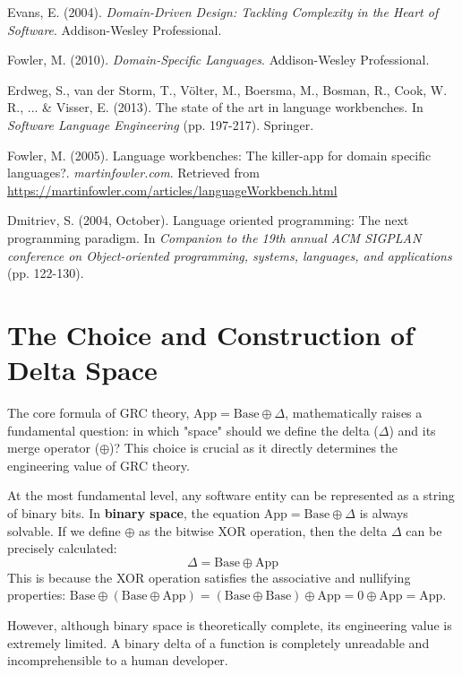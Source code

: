 \documentclass[11pt]{article}
\begin{document}
\begin{thebibliography}{99}
Evans, E. (2004). \textit{Domain-Driven Design: Tackling Complexity in the Heart of Software}. Addison-Wesley Professional.

Fowler, M. (2010). \textit{Domain-Specific Languages}. Addison-Wesley Professional.

Erdweg, S., van der Storm, T., Völter, M., Boersma, M., Bosman, R., Cook, W. R., ... \& Visser, E. (2013). The state of the art in language workbenches. In \textit{Software Language Engineering} (pp. 197-217). Springer.

Fowler, M. (2005). Language workbenches: The killer-app for domain specific languages?. \textit{martinfowler.com}. Retrieved from \url{https://martinfowler.com/articles/languageWorkbench.html}

Dmitriev, S. (2004, October). Language oriented programming: The next programming paradigm. In \textit{Companion to the 19th annual ACM SIGPLAN conference on Object-oriented programming, systems, languages, and applications} (pp. 122-130).

\end{thebibliography}

\appendix

\section{The Choice and Construction of Delta Space}

The core formula of GRC theory, $\text{App} = \text{Base} \oplus \Delta$, mathematically raises a fundamental question: in which "space" should we define the delta ($\Delta$) and its merge operator ($\oplus$)? This choice is crucial as it directly determines the engineering value of GRC theory.

At the most fundamental level, any software entity can be represented as a string of binary bits. In \textbf{binary space}, the equation $\text{App} = \text{Base} \oplus \Delta$ is always solvable. If we define $\oplus$ as the bitwise XOR operation, then the delta $\Delta$ can be precisely calculated:
\[
\Delta = \text{Base} \oplus \text{App}
\]
This is because the XOR operation satisfies the associative and nullifying properties: $\text{Base} \oplus (\text{Base} \oplus \text{App}) = (\text{Base} \oplus \text{Base}) \oplus \text{App} = 0 \oplus \text{App} = \text{App}$.

However, although binary space is theoretically complete, its engineering value is extremely limited. A binary delta of a function is completely unreadable and incomprehensible to a human developer.
\end{document}
